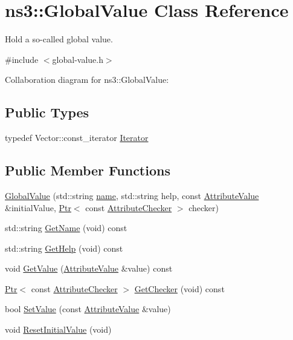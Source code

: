 \hypertarget{classns3_1_1GlobalValue}{}\section{ns3\+:\+:Global\+Value Class Reference}
\label{classns3_1_1GlobalValue}


Hold a so-\/called \textquotesingle{}global value\textquotesingle{}.  




{\ttfamily \#include $<$global-\/value.\+h$>$}



Collaboration diagram for ns3\+:\+:Global\+Value\+:
\subsection*{Public Types}
\begin{DoxyCompactItemize}
\item 
typedef Vector\+::const\+\_\+iterator \hyperlink{classns3_1_1GlobalValue_a1bb2cbb186e3759817095c9a5f5f544e}{Iterator}
\end{DoxyCompactItemize}
\subsection*{Public Member Functions}
\begin{DoxyCompactItemize}
\item 
\hyperlink{classns3_1_1GlobalValue_ae47d892d6a279694b0c591f960e34538}{Global\+Value} (std\+::string \hyperlink{generate__test__data__lte__spectrum__model_8m_ab74e6bf80237ddc4109968cedc58c151}{name}, std\+::string help, const \hyperlink{classns3_1_1AttributeValue}{Attribute\+Value} \&initial\+Value, \hyperlink{classns3_1_1Ptr}{Ptr}$<$ const \hyperlink{classns3_1_1AttributeChecker}{Attribute\+Checker} $>$ checker)
\item 
std\+::string \hyperlink{classns3_1_1GlobalValue_a3ab8f8107850b073397f48ff79b52372}{Get\+Name} (void) const 
\item 
std\+::string \hyperlink{classns3_1_1GlobalValue_a732b51b86f100b514563e1011c3ced9e}{Get\+Help} (void) const 
\item 
void \hyperlink{classns3_1_1GlobalValue_aa33773cb952ba3c285a03ae2c4769b84}{Get\+Value} (\hyperlink{classns3_1_1AttributeValue}{Attribute\+Value} \&value) const 
\item 
\hyperlink{classns3_1_1Ptr}{Ptr}$<$ const \hyperlink{classns3_1_1AttributeChecker}{Attribute\+Checker} $>$ \hyperlink{classns3_1_1GlobalValue_af903c3b90cb8c0d3d0809d37135351f0}{Get\+Checker} (void) const 
\item 
bool \hyperlink{classns3_1_1GlobalValue_ac719e4b4614ccb8199e5ee97d9a5d303}{Set\+Value} (const \hyperlink{classns3_1_1AttributeValue}{Attribute\+Value} \&value)
\item 
void \hyperlink{classns3_1_1GlobalValue_a8af93b79db5f5fce2e6a4be9c84c0202}{Reset\+Initial\+Value} (void)
\end{DoxyCompactItemize}
